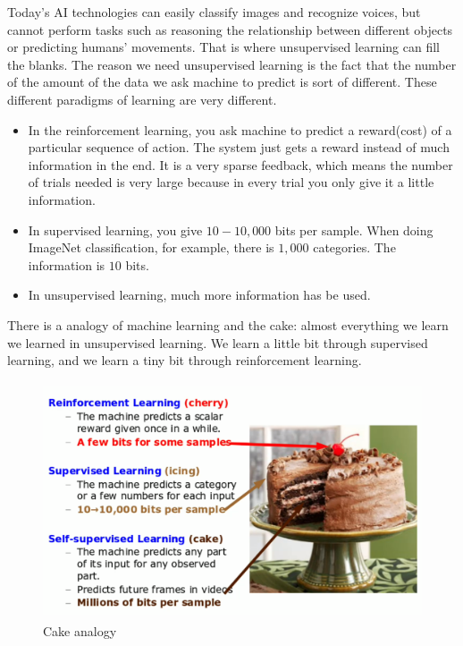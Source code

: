 Today’s AI technologies can easily classify images and recognize voices, but cannot perform tasks such as reasoning the relationship between different objects or predicting humans’ movements. That is where unsupervised learning can fill the blanks. The reason we need unsupervised learning is the fact that the number of the amount of the data we ask machine to predict is sort of different. These different paradigms of learning are very different.

\begin{itemize}
    \item In the reinforcement learning, you ask machine to predict a reward(cost) of a particular sequence of action. The system just gets a reward instead of much information in the end. It is a very sparse feedback, which means the number of trials needed is very large because in every trial you only give it a little information.

    \item In supervised learning, you give $10-10,000$ bits per sample. When doing ImageNet classification, for example, there is $1,000$ categories. The information is $10$ bits.

    \item In unsupervised learning, much more information has be used.
\end{itemize}

There is a analogy of machine learning and the cake: almost everything we learn we learned in unsupervised learning. We learn a little bit through supervised learning, and we learn a tiny bit through reinforcement learning.

\begin{figure}[ht]
\centering
\includegraphics[height=7cm]{lectures/08-a/cake.png}
\caption{Cake analogy}
\label{fig:label}
\end{figure}

